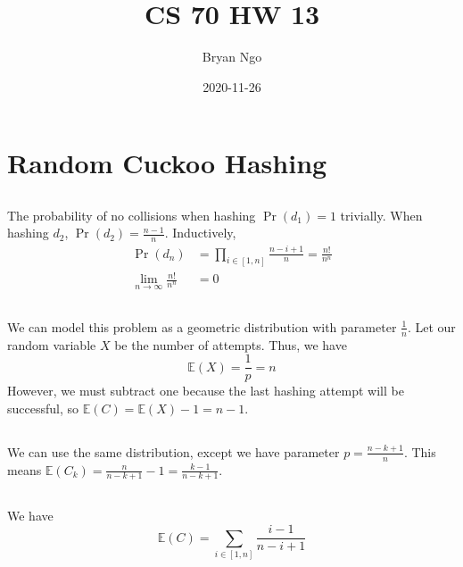 \documentclass{article}
\title{CS 70 HW 13}
\author{Bryan Ngo}
\date{2020-11-26}
\newcommand{\E}{\mathbb{E}}
\begin{document}
\maketitle

\section{Random Cuckoo Hashing}

\subsection{}

The probability of no collisions when hashing \(\Pr(d_1) = 1\) trivially.
When hashing \(d_2\), \(\Pr(d_2) = \frac{n - 1}{n}\).
Inductively,
\begin{align}
    \Pr(d_n) &= \prod_{i \in [1, n]} \frac{n - i + 1}{n} = \frac{n!}{n^n} \\
    \lim_{n \to \infty} \frac{n!}{n^n} &= 0
\end{align}

\subsection{}

We can model this problem as a geometric distribution with parameter \(\frac{1}{n}\).
Let our random variable \(X\) be the number of attempts.
Thus, we have
\begin{equation}
    \E(X) = \frac{1}{p} = n
\end{equation}
However, we must subtract one because the last hashing attempt will be successful, so \(\E(C) = \E(X) - 1 = n - 1\).

\subsection{}

We can use the same distribution, except we have parameter \(p = \frac{n - k + 1}{n}\).
This means \(\E(C_k) = \frac{n}{n - k + 1} - 1 = \frac{k - 1}{n - k + 1}\).

\subsection{}

We have
\begin{equation}
    \E(C) = \sum_{i \in [1, n]} \frac{i - 1}{n - i + 1}
\end{equation}
\end{document}
